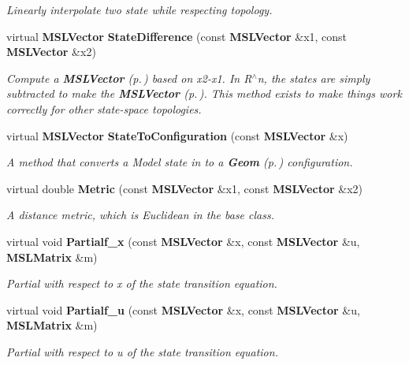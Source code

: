 \begin{CompactItemize}
\begin{CompactList}\small\item\em Linearly interpolate two state while respecting topology.\item\end{CompactList}\item 
virtual {\bf MSLVector} {\bf State\-Difference} (const {\bf MSLVector} \&x1, const {\bf MSLVector} \&x2)
\begin{CompactList}\small\item\em Compute a {\bf MSLVector} {\rm (p.\,\pageref{class_MSLVector})} based on x2-x1. In R$^\wedge$n, the states are simply subtracted to make the {\bf MSLVector} {\rm (p.\,\pageref{class_MSLVector})}. This method exists to make things work correctly for other state-space topologies.\item\end{CompactList}\item 
virtual {\bf MSLVector} {\bf State\-To\-Configuration} (const {\bf MSLVector} \&x)
\begin{CompactList}\small\item\em A method that converts a Model state in to a {\bf Geom} {\rm (p.\,\pageref{class_Geom})} configuration.\item\end{CompactList}\item 
virtual double {\bf Metric} (const {\bf MSLVector} \&x1, const {\bf MSLVector} \&x2)
\begin{CompactList}\small\item\em A distance metric, which is Euclidean in the base class.\item\end{CompactList}\item 
virtual void {\bf Partialf\_\-x} (const {\bf MSLVector} \&x, const {\bf MSLVector} \&u, {\bf MSLMatrix} \&m)
\begin{CompactList}\small\item\em Partial with respect to x of the state transition equation.\item\end{CompactList}\item 
virtual void {\bf Partialf\_\-u} (const {\bf MSLVector} \&x, const {\bf MSLVector} \&u, {\bf MSLMatrix} \&m)
\begin{CompactList}\small\item\em Partial with respect to u of the state transition equation.\item\end{CompactList}\item 

\end{CompactItemize}

